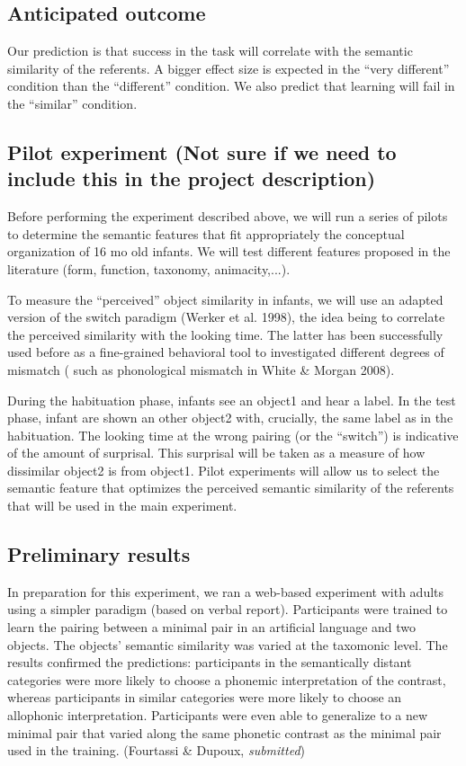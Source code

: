 \documentclass[12pt]{article}
\begin{document}
\subsection*{Anticipated outcome}
Our prediction is that success in the task will correlate with the semantic similarity of the referents. A bigger effect size is expected in the “very different” condition than the “different” condition. We also predict that learning will fail in the “similar” condition.

\subsection*{Pilot experiment (Not sure if we need to include this in the project description)}
Before performing the experiment described above, we will run a series of pilots to determine the semantic features that fit appropriately the conceptual organization of 16 mo old infants.  We will test different features proposed in the literature (form, function, taxonomy, animacity,...).

To measure the “perceived” object similarity in infants, we will use an adapted version of the switch paradigm (Werker et al. 1998), the idea being to correlate the perceived similarity with the looking time. The latter has been successfully used before as a fine-grained behavioral tool to investigated different degrees of mismatch ( such as phonological mismatch  in White \& Morgan 2008).

During the habituation phase, infants see an object1 and hear a label. In the test phase, infant are shown an other object2 with, crucially, the same label as in the habituation. The looking time at the wrong pairing (or the “switch”) is indicative of the amount of surprisal. 
This surprisal will be taken as a measure of how dissimilar object2 is from object1. Pilot experiments will allow us to select the semantic feature that optimizes the perceived semantic similarity of the referents that will be used in the main experiment.

\subsection*{Preliminary results}
In preparation for this experiment, we ran a web-based experiment with adults using a simpler paradigm (based on verbal report).  Participants were trained to learn the pairing between a minimal pair in an artificial language and two objects. The objects' semantic similarity was varied at the taxomonic level. The results confirmed the predictions: participants in the semantically distant categories were more likely to choose a phonemic interpretation of the contrast, whereas participants in similar categories were more likely to choose an allophonic interpretation. Participants were even able to generalize to a new minimal pair that varied along the same phonetic contrast as the minimal pair used in the training. (Fourtassi \& Dupoux, \textit{submitted})
\end{document}
